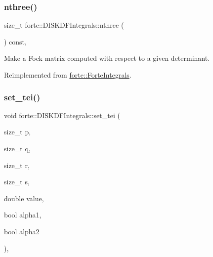 \mbox{\label{classforte_1_1_d_i_s_k_d_f_integrals_a56b38fd57064c9d6464f2173127835bd}} 
\subsubsection{\texorpdfstring{nthree()}{nthree()}}
{\footnotesize\ttfamily size\+\_\+t forte\+::\+D\+I\+S\+K\+D\+F\+Integrals\+::nthree (\begin{DoxyParamCaption}{ }\end{DoxyParamCaption}) const\hspace{0.3cm}{\ttfamily [override]}, {\ttfamily [virtual]}}



Make a Fock matrix computed with respect to a given determinant. 



Reimplemented from \mbox{\hyperlink{classforte_1_1_forte_integrals_af04858e7813556747745f90ffbda81a4}{forte\+::\+Forte\+Integrals}}.

\mbox{\label{classforte_1_1_d_i_s_k_d_f_integrals_aceee5961cd70cfc7fc9b7799675f8fb6}} 
\subsubsection{\texorpdfstring{set\+\_\+tei()}{set\_tei()}}
{\footnotesize\ttfamily void forte\+::\+D\+I\+S\+K\+D\+F\+Integrals\+::set\+\_\+tei (\begin{DoxyParamCaption}\item[{size\+\_\+t}]{p,  }\item[{size\+\_\+t}]{q,  }\item[{size\+\_\+t}]{r,  }\item[{size\+\_\+t}]{s,  }\item[{double}]{value,  }\item[{bool}]{alpha1,  }\item[{bool}]{alpha2 }\end{DoxyParamCaption})\hspace{0.3cm}{\ttfamily [override]}, {\ttfamily [virtual]}}



